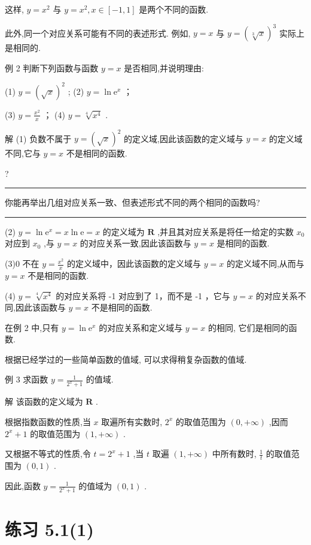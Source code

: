 \documentclass[10pt]{article}
\newcommand{\HRule}{\begin{center}\rule{0.9\linewidth}{0.2mm}\end{center}}
\begin{document}
这样, \(y = {x}^{2}\) 与 \(y = {x}^{2},x \in  \left\lbrack  {-1,1}\right\rbrack\) 是两个不同的函数.

此外,同一个对应关系可能有不同的表述形式. 例如, \(y = x\) 与 \(y = {\left( \sqrt[3]{x}\right) }^{3}\) 实际上是相同的.

例 2 判断下列函数与函数 \(y = x\) 是否相同,并说明理由:

(1) \(y = {\left( \sqrt{x}\right) }^{2}\) ; (2) \(y = \ln {\mathrm{e}}^{x}\) ；

(3) \(y = \frac{{x}^{2}}{x}\) ； (4) \(y = \sqrt[4]{{x}^{4}}\) .

解 (1) 负数不属于 \(y = {\left( \sqrt{x}\right) }^{2}\) 的定义域,因此该函数的定义域与 \(y = x\) 的定义域不同,它与 \(y = x\) 不是相同的函数.

?

\HRule

你能再举出几组对应关系一致、但表述形式不同的两个相同的函数吗?

\HRule

(2) \(y = \ln {\mathrm{e}}^{x} = x\ln \mathrm{e} = x\) 的定义域为 \(\mathbf{R}\) ,并且其对应关系是将任一给定的实数 \({x}_{0}\) 对应到 \({x}_{0}\) ,与 \(y = x\) 的对应关系一致,因此该函数与 \(y = x\) 是相同的函数.

(3)0 不在 \(y = \frac{{x}^{2}}{x}\) 的定义域中，因此该函数的定义域与 \(y = x\) 的定义域不同,从而与 \(y = x\) 不是相同的函数.

(4) \(y = \sqrt[4]{{x}^{4}}\) 的对应关系将 -1 对应到了 1，而不是 -1 ，它与 \(y = x\) 的对应关系不同,因此该函数与 \(y = x\) 不是相同的函数.

在例 2 中,只有 \(y = \ln {\mathrm{e}}^{x}\) 的对应关系和定义域与 \(y = x\) 的相同, 它们是相同的函数.

根据已经学过的一些简单函数的值域, 可以求得稍复杂函数的值域.

例 3 求函数 \(y = \frac{1}{{2}^{x} + 1}\) 的值域.

解 该函数的定义域为 \(\mathbf{R}\) .

根据指数函数的性质,当 \(x\) 取遍所有实数时, \({2}^{x}\) 的取值范围为 \(\left( {0, + \infty }\right)\) ,因而 \({2}^{x} + 1\) 的取值范围为 \(\left( {1, + \infty }\right)\) .

又根据不等式的性质,令 \(t = {2}^{x} + 1\) ,当 \(t\) 取遍 \(\left( {1, + \infty }\right)\) 中所有数时, \(\frac{1}{t}\) 的取值范围为 \(\left( {0,1}\right)\) .

因此,函数 \(y = \frac{1}{{2}^{x} + 1}\) 的值域为 \(\left( {0,1}\right)\) .

\section*{练习 5.1(1)}
\end{document}
